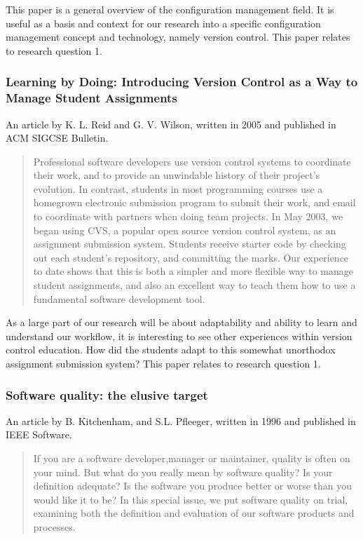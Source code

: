 \documentclass{llncs}
\begin{document}
This paper is a general overview of the configuration management
field. It is useful as a basis and context for our research into a
specific configuration management concept and technology, namely
version control. This paper relates to research question 1.

\subsubsection{Learning by Doing: Introducing Version Control as a Way to
               Manage Student Assignments}

An article by K. L. Reid and G. V. Wilson, written in 2005 and published in
ACM SIGCSE Bulletin.

\begin{abstract}
 Professional software developers use version control systems to coordinate
 their work, and to provide an unwindable history of their project's
 evolution. In contrast, students in most programming courses use a
 homegrown electronic submission program to submit their work, and email to
 coordinate with partners when doing team projects. In May 2003, we began
 using CVS, a popular open source version control system, as an assignment
 submission system. Students receive starter code by checking out each
 student's repository, and committing the marks. Our experience to date
 shows that this is both a simpler and more flexible way to manage student
 assignments, and also an excellent way to teach them how to use a
 fundamental software development tool.
\end{abstract}

As a large part of our research will be about adaptability and ability
to learn and understand our workflow, it is interesting to see other
experiences within version control education. How did the students
adapt to this somewhat unorthodox assignment submission system? This
paper relates to research question 1.

\subsubsection{Software quality: the elusive target}

An article by B. Kitchenham, and S.L. Pfleeger, written in 1996 and
published in IEEE Software.

\begin{abstract}
 If you are a software developer,manager or maintainer, quality is
 often on your mind. But what do you really mean by software quality?
 Is your definition adequate? Is the software you produce better or
 worse than you would like it to be? In this special issue, we put
 software quality on trial, examining both the definition and
 evaluation of our software products and processes.
\end{abstract}
\end{document}
